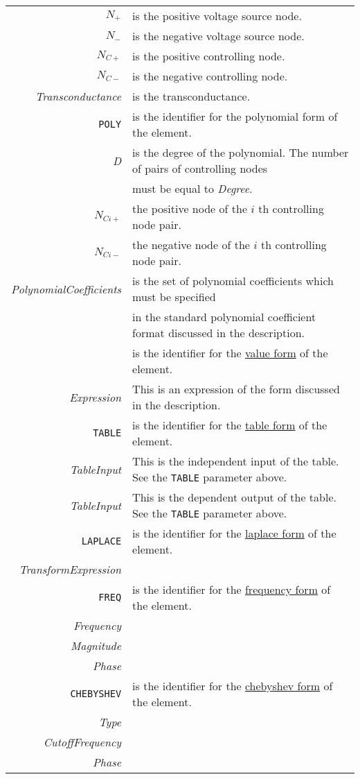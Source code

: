 \begin{tabular}{r l}
$N_{+}$ & is the positive voltage source node.\\
$N_{-}$ & is the negative voltage source node.\\
$N_{C+}$ & is the positive controlling node.\\
$N_{C-}$ & is the negative controlling node.\\
{\it Transconductance} & is the transconductance.\\
{\tt POLY} & is the identifier for the polynomial form of the
element.\\
{\it D} & is the degree of the polynomial. The number of
pairs of controlling nodes \\
& must be equal to {\it Degree}.\\
$N_{Ci+}$ & the positive node of the $i$ th controlling node
pair.\\
$N_{Ci-}$ & the negative node of the $i$ th controlling node
pair.\\
{\it PolynomialCoefficients} & is the set of polynomial
coefficients which must be specified\\
& in the standard polynomial coefficient format discussed in the description.\\
\notforsspice{ {\tt VALUE} & is the identifier for the
\underline{value form} of the element.\\
{\it Expression} & This is an expression of the form discussed in the description.\\
{\tt TABLE} & is the identifier for the \underline{table form} of
the element.\\
{\it TableInput} & This is the independent input of the table. See
the {\tt TABLE} parameter above.\\
{\it TableInput} & This is the dependent output of the table. See
the {\tt TABLE} parameter above.\\
{\tt LAPLACE} & is the identifier for the \underline{laplace form}
of the element.\\
{\it TransformExpression}\\
{\tt FREQ} & is the identifier for the \underline{frequency form} of the element.\\
{\it Frequency}\\
{\it Magnitude}\\
{\it Phase}\\
{\tt CHEBYSHEV} & is the identifier for the \underline{chebyshev
form} of the element.\\
{\it Type}\\
{\it CutoffFrequency}\\
{\it Phase}}
\end{tabular}
